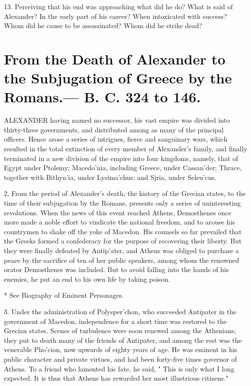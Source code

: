 \documentclass[openany,a4paper]{memoir}
\begin{document}
13. Perceiving that 
his end was approaching what did he do? What is said of Alexander? In the early part of his career? When intoxicated with success? 
Whom did he cause to be assassinated? Whom did he strike dead? 


\chapter{From the Death of Alexander to the Subjugation 
of Greece by the Romans.— B. C. 324 to 146.} 

ALEXANDER having named no successor, his vast empire was divided into thirty-three governments, and distributed among as many of the principal officers. Hence arose 
a series of intrigues, fierce and sanguinary wars, which resulted in the total extinction of every member of Alexander's 
family, and finally terminated in a new division of the empire 
into four kingdoms, namely, that of Egypt under Ptolemy; 
Macedo'nia, including Greece, under Cassan'der; Thrace, 
together with Bithyn'ia, under Lysima'chus; and Sjria, 
under Seleu'cus. 

2, From the period of Alexander's death, the history of 
the Grecian states, to the time of their subjugation by the 
Romans, presents only a series of uninteresting revolutions. 
When the news of this event reached Athens, Demosthenes 
once more made a noble effort to vindicate the national freedom, and to arouse his countrymen to shake off the yoke of 
Macedon. His counsels so far prevailed that the Greeks 
formed a confederacy for the purpose of recovering their 
liberty. But they were finally defeated by Antip'ater, and 
Athens was obliged to purchase a peace by the sacrifice of 
ten of her public speakers, among whom the renowned orator 
Demosthenes was included. But to avoid falling into the 
hands of his enemies, he put an end to his own life by taking 
poison. 

* See Biography of Eminent Personages. 


3. Under the administration of Polysper'chon, who succeeded Antipater in the government of Macedon, independence for a short time was restored to the Grecian states. 
Scenes of turbulence were soon renewed among the Athenians; they put to death many of the friends of Antipater, 
and among the rest was the venerable Pho'cion, now upwards 
of eighty years of age. He was eminent in his public character and private virtues, and had been forty-five times governor of Athens. To a friend who lamented his fate, he said, 
" This is only what I long expected. It is thus that Athens 
has rewarded her most illustrious citizens." 
\end{document}
